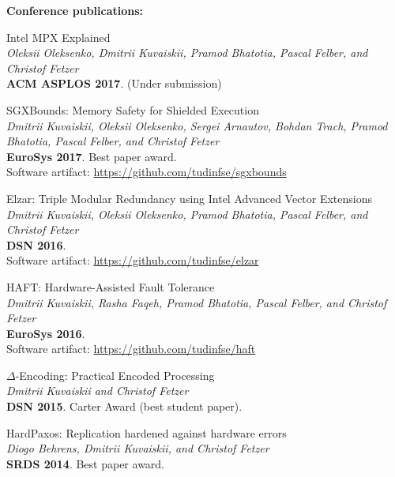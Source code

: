 \documentclass[letterpaper]{article}
\renewenvironment{itemize}{
  \begin{list}{}{
    \setlength{\leftmargin}{1.5em}
  }
}{
  \end{list}
}
\begin{document}
{\bf Conference publications:}
\begin{itemize}

\item Intel MPX Explained\\
{\em Oleksii Oleksenko, {Dmitrii Kuvaiskii}, Pramod Bhatotia,  Pascal Felber, and Christof Fetzer}\\
{\bf ACM ASPLOS 2017}. (Under submission)

\item SGXBounds: Memory Safety for Shielded Execution\\
{\em Dmitrii Kuvaiskii, Oleksii Oleksenko, Sergei Arnautov, Bohdan Trach, Pramod Bhatotia, Pascal Felber, and Christof Fetzer}\\
{\bf  EuroSys 2017}. Best paper award.\\
Software artifact: \href{https://github.com/tudinfse/sgxbounds}{https://github.com/tudinfse/sgxbounds}

\item Elzar: Triple Modular Redundancy using Intel Advanced Vector Extensions\\
{\em Dmitrii Kuvaiskii, Oleksii Oleksenko, Pramod Bhatotia, Pascal Felber, and  Christof Fetzer}\\
{\bf  DSN 2016}.\\
Software artifact: \href{https://github.com/tudinfse/elzar}{https://github.com/tudinfse/elzar}

\item HAFT: Hardware-Assisted Fault Tolerance\\
{\em Dmitrii Kuvaiskii, Rasha Faqeh, Pramod Bhatotia, Pascal Felber, and  Christof Fetzer}\\
{\bf  EuroSys 2016}.\\
Software artifact: \href{https://github.com/tudinfse/haft}{https://github.com/tudinfse/haft}

\item $\Delta$-Encoding: Practical Encoded Processing\\
{\em Dmitrii Kuvaiskii and Christof Fetzer}\\
{\bf   DSN 2015}. Carter Award (best student paper).


\item HardPaxos: Replication hardened against hardware errors\\
{\em Diogo Behrens, {Dmitrii Kuvaiskii}, and Christof Fetzer}\\
{\bf SRDS 2014}. Best paper award.

\end{itemize}
\end{document}
